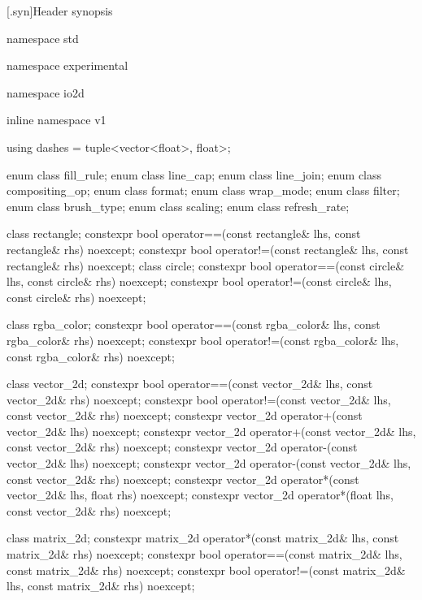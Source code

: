 [\iotwod.syn]{Header  synopsis}

%
%
\begin{codeblock}

namespace std { namespace experimental {
  namespace io2d { inline namespace v1 {

  using dashes = tuple<vector<float>, float>;

  enum class fill_rule;
  enum class line_cap;
  enum class line_join;
  enum class compositing_op;
  enum class format;
  enum class wrap_mode;
  enum class filter;
  enum class brush_type;
  enum class scaling;
  enum class refresh_rate;

  class rectangle;
  constexpr bool operator==(const rectangle& lhs, const rectangle& rhs) 
    noexcept;
  constexpr bool operator!=(const rectangle& lhs, const rectangle& rhs) 
    noexcept;
  class circle;
  constexpr bool operator==(const circle& lhs, const circle& rhs) noexcept;
  constexpr bool operator!=(const circle& lhs, const circle& rhs) noexcept;

  class rgba_color;
  constexpr bool operator==(const rgba_color& lhs, const rgba_color& rhs) 
    noexcept;
  constexpr bool operator!=(const rgba_color& lhs, const rgba_color& rhs) 
    noexcept;

  class vector_2d;
  constexpr bool operator==(const vector_2d& lhs, const vector_2d& rhs) 
    noexcept;
  constexpr bool operator!=(const vector_2d& lhs, const vector_2d& rhs) 
    noexcept;
  constexpr vector_2d operator+(const vector_2d& lhs) noexcept;
  constexpr vector_2d operator+(const vector_2d& lhs, const vector_2d& rhs) 
    noexcept;
  constexpr vector_2d operator-(const vector_2d& lhs) noexcept;
  constexpr vector_2d operator-(const vector_2d& lhs, const vector_2d& rhs) 
    noexcept;
  constexpr vector_2d operator*(const vector_2d& lhs, float rhs) noexcept;
  constexpr vector_2d operator*(float lhs, const vector_2d& rhs) noexcept;

  class matrix_2d;
  constexpr matrix_2d operator*(const matrix_2d& lhs, const matrix_2d& rhs) 
    noexcept;
  constexpr bool operator==(const matrix_2d& lhs, const matrix_2d& rhs) 
    noexcept;
  constexpr bool operator!=(const matrix_2d& lhs, const matrix_2d& rhs) 
    noexcept;

}}}}
\end{codeblock}
